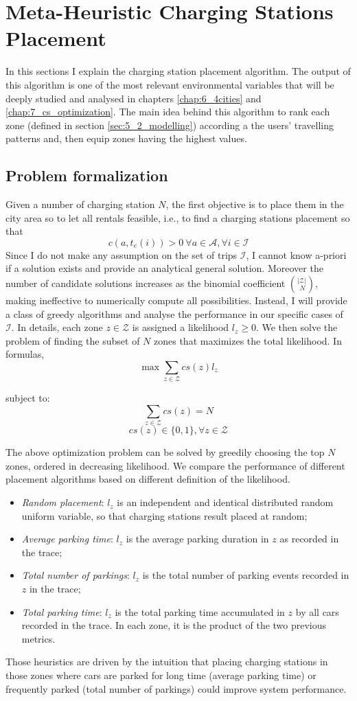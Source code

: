 \section{Meta-Heuristic Charging Stations Placement}
\label{sec:5_3_mh_placement}
In this sections I explain the charging station placement algorithm. The output of this algorithm is one of the most relevant environmental variables that will be deeply studied and analysed in chapters \ref{chap:6_4cities} and \ref{chap:7_cs_optimization}. The main idea behind this algorithm to rank each zone (defined in section \ref{sec:5_2_modelling}) according a the users' travelling patterns and, then equip zones having the highest values.


\subsection{Problem formalization}
Given a number of charging station $N$, the first objective is to place them in the city area so to let all rentals feasible, i.e., to find a charging stations placement so that
\[
c(a,t_e(i))>0\ \forall a \in \mathcal{A}, \forall  i \in \mathcal{I}
\]
Since I do not make any assumption on the set of trips $\mathcal{I}$, I cannot know a-priori if a solution exists and provide an analytical general solution. Moreover the number of candidate solutions increases as the binomial coefficient ${\left\vert{\mathcal{Z}}\right\vert}\choose\ N$, making ineffective to numerically compute all possibilities. Instead, I will provide a class of greedy algorithms and analyse the performance in our specific cases of $\mathcal{I}$.
In details, each zone $z\in\mathcal{Z}$ is assigned a likelihood $l_z \geq 0$.
We then solve the problem of finding the subset of $N$ zones that maximizes the total likelihood. In formulas, 
$$\max \sum_{z\in\mathcal{Z}} cs(z)l_z$$

subject to:
$$\sum_{z\in\mathcal{Z}} cs(z) = N$$
$$cs(z)\in \{0,1\},  \forall z \in \mathcal{Z}$$

The above optimization problem can be solved by greedily choosing the top $N$ zones, ordered in decreasing likelihood. We compare the performance of different placement algorithms based on different definition of the likelihood.
\begin{itemize}
	\item{\it Random placement}: $l_z$ is an independent and identical distributed random uniform variable, so that charging stations result placed at random;
	\item{\it Average parking time}: $l_z$ is the average parking duration in $z$ as recorded in the trace;
	\item{\it Total number of parkings}: $l_z$ is the total number of parking events recorded in $z$ in the trace;
	\item{\it Total parking time}: $l_z$ is the total parking time accumulated in $z$ by all cars recorded in the trace. In each zone, it is the product of the two previous metrics.
\end{itemize}
Those heuristics are driven by the intuition that placing charging stations in those zones where cars are parked for long time (average parking time) or frequently parked (total number of parkings) could improve system performance.


